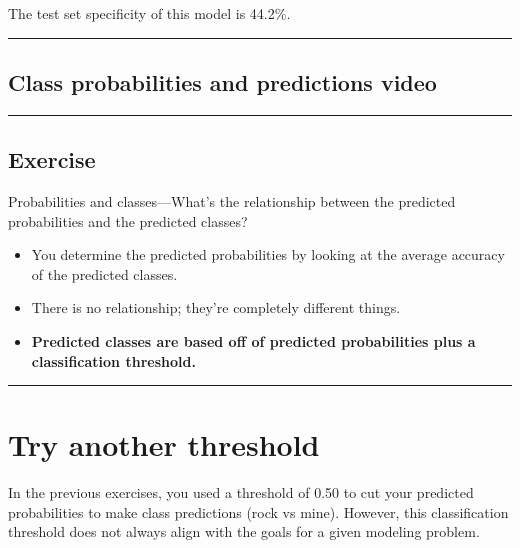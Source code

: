 \documentclass[
]{book}
\begin{document}
The test set specificity of this model is 44.2\%.

\begin{center}\rule{0.5\linewidth}{0.5pt}\end{center}

\hypertarget{class-probabilities-and-predictions-video}{%
\subsection*{Class probabilities and predictions video}\label{class-probabilities-and-predictions-video}}

\begin{center}\rule{0.5\linewidth}{0.5pt}\end{center}

\hypertarget{exercise-13}{%
\subsection*{Exercise}\label{exercise-13}}

Probabilities and classes---What's the relationship between the predicted probabilities and the predicted classes?

\begin{itemize}
\item
  You determine the predicted probabilities by looking at the average accuracy of the predicted classes.
\item
  There is no relationship; they're completely different things.
\item
  \textbf{Predicted classes are based off of predicted probabilities plus a classification threshold.}
\end{itemize}

\begin{center}\rule{0.5\linewidth}{0.5pt}\end{center}

\hypertarget{try-another-threshold}{%
\section{Try another threshold}\label{try-another-threshold}}

In the previous exercises, you used a threshold of 0.50 to cut your predicted probabilities to make class predictions (rock vs mine). However, this classification threshold does not always align with the goals for a given modeling problem.
\end{document}
